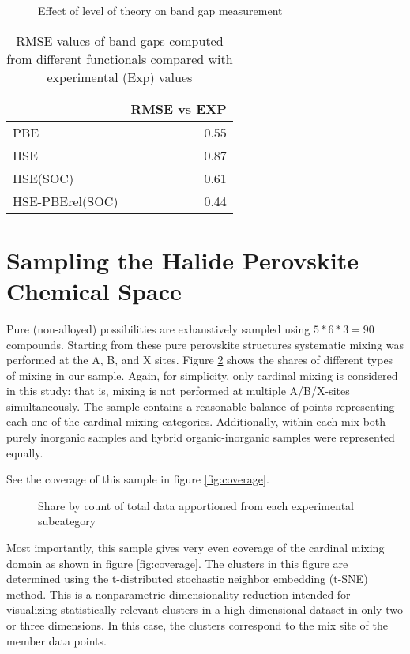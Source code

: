  
\begin{figure}[htbp]
\centering

\caption{\label{fig:expqual} Effect of level of theory on band gap measurement}
\end{figure}

 
\begin{table}[htbp]
\caption{\label{tbl:expquant} RMSE values of band gaps computed from different functionals compared with experimental (Exp) values}
\centering
\begin{tabular}{lr}
 & RMSE vs EXP\\[0pt]
\hline
PBE & 0.55\\[0pt]
HSE & 0.87\\[0pt]
HSE(SOC) & 0.61\\[0pt]
HSE-PBErel(SOC) & 0.44\\[0pt]
\end{tabular}
\end{table}

\section{Sampling the Halide Perovskite Chemical Space}
\label{sec:org536e092}
Pure (non-alloyed) possibilities are exhaustively sampled using \(5*6*3 = 90\) compounds.
Starting from these pure perovskite structures systematic mixing was performed at the A, B, and X sites.
Figure \ref{fig:lot_mix_org} shows the shares of different types of mixing in our sample.
Again, for simplicity, only cardinal mixing is considered in this study: that is, mixing is not performed at multiple A/B/X-sites simultaneously.
The sample contains a reasonable balance of points representing each one of the cardinal mixing categories.
Additionally, within each mix both purely inorganic samples and hybrid organic-inorganic samples were represented equally.

See the coverage of this sample in figure \ref{fig:coverage}.

 
\begin{figure}[htbp]
\centering

\caption{\label{fig:lot_mix_org} Share by count of total data apportioned from each experimental subcategory}
\end{figure}

Most importantly, this sample gives very even coverage of the cardinal mixing domain as shown in figure \ref{fig:coverage}.
The clusters in this figure are determined using the t-distributed stochastic neighbor embedding (t-SNE) method.
This is a nonparametric dimensionality reduction intended for visualizing statistically relevant clusters in a high dimensional dataset in only two or three dimensions.
In this case, the clusters correspond to the mix site of the member data points.

